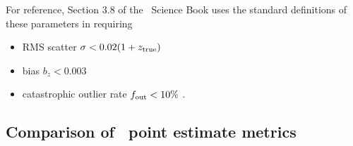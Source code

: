 For reference, Section 3.8 of the \lsst\ Science Book \citep{Abell:09} uses the standard definitions of these parameters in requiring
\begin{itemize}
	\item RMS scatter $\sigma < 0.02 (1 + z_{\rm true})$
	\item bias $b_{z} < 0.003$ %
	\item catastrophic outlier rate $f_{\rm out} < 10\%$ %
	.
\end{itemize}

\subsection{Comparison of \pz\ point estimate metrics}

